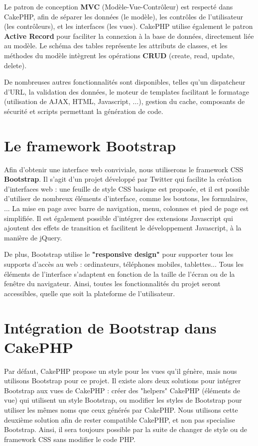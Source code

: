 \documentclass[10pt]{article}
\begin{document}
Le patron de conception \textbf{MVC} (Modèle-Vue-Contrôleur) est respecté dans CakePHP, afin de séparer les données (le modèle), les contrôles de l'utilisateur (les contrôleurs), et les interfaces (les vues). CakePHP utilise également le patron \textbf{Active Record} pour faciliter la connexion à la base de données, directement liée au modèle. Le schéma des tables représente les attributs de classes, et les méthodes du modèle intègrent les opérations \textbf{CRUD} (create, read, update, delete).


De nombreuses autres fonctionnalités sont disponibles, telles qu'un dispatcheur d'URL, la validation des données, le moteur de templates facilitant le formatage (utilisation de AJAX, HTML, Javascript, ...), gestion du cache, composants de sécurité et scripts permettant la génération de code.

\newpage
\section{Le framework Bootstrap}

Afin d'obtenir une interface web conviviale, nous utiliserons le framework CSS \textbf{Bootstrap}. Il s'agit d'un projet développé par Twitter qui facilite la création d'interfaces web : une feuille de style CSS basique est proposée, et il est possible d'utiliser de nombreux éléments d'interface, comme les boutons, les formulaires, ... La mise en page avec barre de navigation, menu, colonnes et pied de page est simplifiée. Il est également possible d'intégrer des extensions Javascript qui ajoutent des effets de transition et facilitent le développement Javascript, à la manière de jQuery.


De plus, Bootstrap utilise le \textbf{"responsive design"} pour supporter tous les supports d'accès au web : ordinateurs, téléphones mobiles, tablettes... Tous les éléments de l'interface s'adaptent en fonction de la taille de l'écran ou de la fenêtre du navigateur. Ainsi, toutes les fonctionnalités du projet seront accessibles, quelle que soit la plateforme de l'utilisateur.


\section{Intégration de Bootstrap dans CakePHP}

Par défaut, CakePHP propose un style pour les vues qu'il génère, mais nous utilisons Bootstrap pour ce projet.
Il existe alors deux solutions pour intégrer Bootstrap aux vues de CakePHP : créer des "helpers" CakePHP (éléments de vue) qui utilisent un style Bootstrap, ou modifier les styles de Bootstrap pour utiliser les mêmes noms que ceux générés par CakePHP.
Nous utilisons cette deuxième solution afin de rester compatible CakePHP, et non pas specialise Bootstrap. Ainsi, il sera toujours possible par la suite de changer de style ou de framework CSS sans modifier le code PHP.
\end{document}
